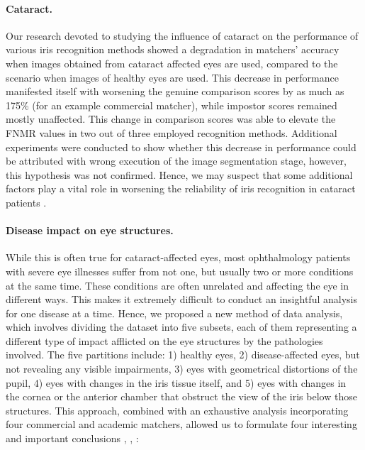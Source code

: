 \documentclass[a4paper,twoside]{article}
\begin{document}
\paragraph{Cataract.} Our research devoted to studying the influence of cataract on the performance of various iris recognition methods showed a degradation in matchers' accuracy when images obtained from cataract affected eyes are used, compared to the scenario when images of healthy eyes are used. This decrease in performance manifested itself with worsening the genuine comparison scores by as much as 175\% (for an example commercial matcher), while impostor scores remained mostly unaffected. This change in comparison scores was able to elevate the FNMR values in two out of three employed recognition methods. Additional experiments were conducted to show whether this decrease in performance could be attributed with wrong execution of the image segmentation stage, however, this hypothesis was not confirmed. Hence, we may suspect that some additional factors play a vital role in worsening the reliability of iris recognition in cataract patients \cite{TrokielewiczWilga2014}.   

\paragraph{Disease impact on eye structures.} While this is often true for cataract-affected eyes, most ophthalmology patients with severe eye illnesses suffer from not one, but usually two or more conditions at the same time. These conditions are often unrelated and affecting the eye in different ways. This makes it extremely difficult to conduct an insightful analysis for one disease at a time. Hence, we proposed a new method of data analysis, which involves dividing the dataset into five subsets, each of them representing a different type of impact afflicted on the eye structures by the pathologies involved. The five partitions include: 1) healthy eyes, 2) disease-affected eyes, but not revealing any visible impairments, 3) eyes with geometrical distortions of the pupil, 4) eyes with changes in the iris tissue itself, and 5) eyes with changes in the cornea or the anterior chamber that obstruct the view of the iris below those structures. This approach, combined with an exhaustive analysis incorporating four commercial and academic matchers, allowed us to formulate four interesting and important conclusions \cite{TrokielewiczCYBCONF2015}, \cite{TrokielewiczBTAS2015}, \cite{TrokielewiczDiseasesIMAVIS}:
\end{document}
